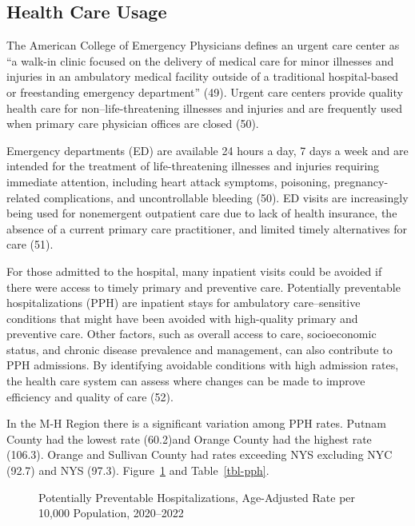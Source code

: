 \documentclass[
  english,
  letterpaper,
]{report}
\begin{document}
\subsection{Health Care Usage}\label{health-care-usage}

The American College of Emergency Physicians defines an urgent care
center as ``a walk-in clinic focused on the delivery of medical care for
minor illnesses and injuries in an ambulatory medical facility outside
of a traditional hospital-based or freestanding emergency department''
(49). Urgent care centers provide quality health care for
non--life-threatening illnesses and injuries and are frequently used
when primary care physician offices are closed (50).

Emergency departments (ED) are available 24 hours a day, 7 days a week
and are intended for the treatment of life-threatening illnesses and
injuries requiring immediate attention, including heart attack symptoms,
poisoning, pregnancy-related complications, and uncontrollable bleeding
(50). ED visits are increasingly being used for nonemergent outpatient
care due to lack of health insurance, the absence of a current primary
care practitioner, and limited timely alternatives for care (51).

For those admitted to the hospital, many inpatient visits could be
avoided if there were access to timely primary and preventive care.
Potentially preventable hospitalizations (PPH) are inpatient stays for
ambulatory care--sensitive conditions that might have been avoided with
high-quality primary and preventive care. Other factors, such as overall
access to care, socioeconomic status, and chronic disease prevalence and
management, can also contribute to PPH admissions. By identifying
avoidable conditions with high admission rates, the health care system
can assess where changes can be made to improve efficiency and quality
of care (52).

In the M-H Region there is a significant variation among PPH rates.
Putnam County had the lowest rate (60.2)and Orange County had the
highest rate (106.3). Orange and Sullivan County had rates exceeding NYS
excluding NYC (92.7) and NYS (97.3). Figure~\ref{fig-pph} and
Table~\ref{tbl-pph}.

\begin{figure}


\caption{\label{fig-pph}Potentially Preventable Hospitalizations,
Age-Adjusted Rate per 10,000 Population, 2020--2022}

\end{figure}%
\end{document}
